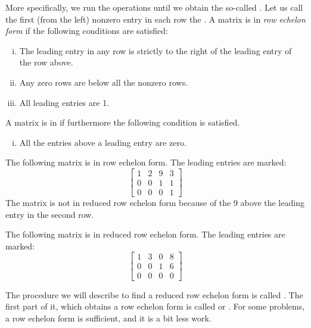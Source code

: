 More specifically, we run the operations until we obtain the so-called
\emph{}.
Let us call
the first (from the left) nonzero entry in each row the
\emph{}.  
A matrix is in \emph{row echelon form} if
the following conditions are satisfied:
\begin{enumerate}[(i)]
\item The leading entry in any row is strictly to the right of
the leading entry of the row above.
\item Any zero rows are below all the nonzero rows.
\item All leading entries are 1.
\end{enumerate}
A matrix is in \emph{}
if furthermore the following condition is satisfied.
\begin{enumerate}[(i),resume]
\item All the entries above a leading entry are zero.
\end{enumerate}

\begin{example}
The following matrix is in row echelon form.  The leading
entries are marked:
\begin{equation*}
\begin{bmatrix}
\boxed{1} & 2 & 9 & 3 \\
0 & 0 & \boxed{1} & 1 \\
0 & 0 & 0 & \boxed{1}
\end{bmatrix}
\end{equation*}
The matrix is not in reduced row echelon form because of the 9 above the
leading entry in the second row.



The following matrix is in reduced row echelon form.  The leading
entries are marked:
\begin{equation*}
\begin{bmatrix}
\boxed{1} & 3 & 0 & 8 \\
0 & 0 & \boxed{1} & 6 \\
0 & 0 & 0 & 0
\end{bmatrix}
\end{equation*}
\end{example}

The procedure we will describe to find a reduced row echelon form
is called \emph{}.
The first part of it, which obtains a row echelon form is called 
\emph{} or
\emph{}.  For some problems, a row echelon
form is sufficient, and it is a bit less work.

